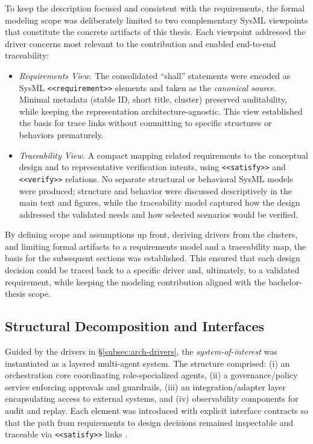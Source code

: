 To keep the description focused and consistent with the requirements, the formal modeling scope was deliberately limited to two complementary SysML viewpoints that constitute the concrete artifacts of this thesis. Each viewpoint addressed the driver concerns most relevant to the contribution and enabled end-to-end traceability:

\begin{itemize}
  \item \emph{Requirements View.} The consolidated “shall” statements were encoded as SysML \texttt{<<requirement>>} elements and taken as the \emph{canonical source}. Minimal metadata (stable ID, short title, cluster) preserved auditability, while keeping the representation architecture-agnostic. This view established the basis for trace links without committing to specific structures or behaviors prematurely.

  \item \emph{Traceability View.} A compact mapping related requirements to the conceptual design and to representative verification intents, using \texttt{<<satisfy>>} and \texttt{<<verify>>} relations. No separate structural or behavioral SysML models were produced; structure and behavior were discussed descriptively in the main text and figures, while the traceability model captured how the design addressed the validated needs and how selected scenarios would be verified.
\end{itemize}

By defining scope and assumptions up front, deriving drivers from the clusters, and limiting formal artifacts to a requirements model and a traceability map, the basis for the subsequent sections was established. This ensured that each design decision could be traced back to a specific driver and, ultimately, to a validated requirement, while keeping the modeling contribution aligned with the bachelor-thesis scope.

\subsection{Structural Decomposition and Interfaces}\label{subsec:structural-decomposition}
Guided by the drivers in §\ref{subsec:arch-drivers}, the \emph{system-of-interest} was instantiated as a layered multi-agent system. The structure comprised: (i) an orchestration core coordinating role-specialized agents, (ii) a governance/policy service enforcing approvals and guardrails, (iii) an integration/adapter layer encapsulating access to external systems, and (iv) observability components for audit and replay. Each element was introduced with explicit interface contracts so that the path from requirements to design decisions remained inspectable and traceable via \texttt{<<satisfy>>} links \parencite{IEEEStandard1990}.

